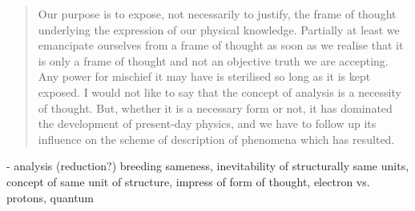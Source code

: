 \begin{quote}
    Our purpose is to expose, not necessarily to justify, the frame of thought underlying the expression of our physical knowledge.  Partially at least we emancipate ourselves from a frame of thought as soon as we realise that it is only a frame of thought and not an objective truth we are accepting.  Any power for mischief it may have is sterilised so long as it is kept exposed.  I would not like to say that the concept of analysis is a necessity of thought.  But, whether it is a necessary form or not, it has dominated the development of present-day physics, and we have to follow up its influence on the scheme of description of phenomena which has resulted.

    \citep[p. 121]{Eddington1939}
\end{quote}

- analysis (reduction?) breeding sameness, inevitability of structurally same units, concept of same unit of structure, impress of form of thought, electron vs. protons, quantum

